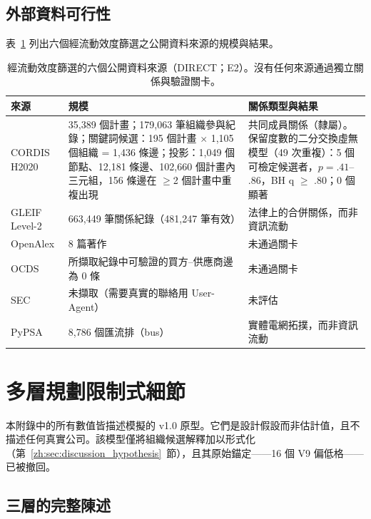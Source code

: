 \section{外部資料可行性}

表~\ref{zh:tab:app_sources} 列出六個經流動效度篩選之公開資料來源的規模與結果。

\begin{table}[tbp]
\centering
\caption{經流動效度篩選的六個公開資料來源（DIRECT；E2）。沒有任何來源通過獨立關係與驗證關卡。}
\label{zh:tab:app_sources}
\footnotesize
\begin{tabular}{p{2.2cm}p{6.6cm}p{5.6cm}}
\toprule
來源 & 規模 & 關係類型與結果 \tabularnewline
\midrule
\raggedright CORDIS H2020 & \raggedright 35,389 個計畫；179,063 筆組織參與紀錄；關鍵詞候選：195 個計畫 $\times$ 1,105 個組織 = 1,436 條邊；投影：1,049 個節點、12,181 條邊、102,660 個計畫內三元組，156 條邊在 $\geq$2 個計畫中重複出現 & \raggedright 共同成員關係（隸屬）。保留度數的二分交換虛無模型（49 次重複）：5 個可檢定候選者，$p=.41$--$.86$，BH q $\geq$ .80；0 個顯著 \tabularnewline
\raggedright GLEIF Level-2 & \raggedright 663,449 筆關係紀錄（481,247 筆有效） & \raggedright 法律上的合併關係，而非資訊流動 \tabularnewline
\raggedright OpenAlex & \raggedright 8 篇著作 & \raggedright 未通過關卡 \tabularnewline
\raggedright OCDS & \raggedright 所擷取紀錄中可驗證的買方--供應商邊為 0 條 & \raggedright 未通過關卡 \tabularnewline
\raggedright SEC & \raggedright 未擷取（需要真實的聯絡用 User-Agent） & \raggedright 未評估 \tabularnewline
\raggedright PyPSA & \raggedright 8,786 個匯流排（bus） & \raggedright 實體電網拓撲，而非資訊流動 \tabularnewline
\bottomrule
\end{tabular}
\end{table}

\chapter{多層規劃限制式細節}
\label{zh:app:mlp}

本附錄中的所有數值皆描述模擬的 v1.0 原型。它們是設計假設而非估計值，且不描述任何真實公司。該模型僅將組織候選解釋加以形式化（第~\ref{zh:sec:discussion_hypothesis}~節），且其原始錨定——16 個 V9 偏低格——已被撤回。

\section{三層的完整陳述}
\label{zh:app:mlp_full}

